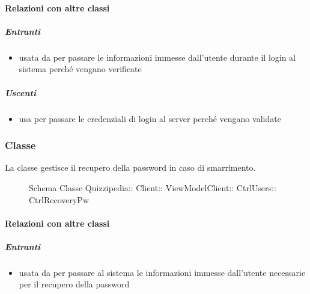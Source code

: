 \paragraph{Relazioni con altre classi}
\subparagraph{Entranti}
\begin{itemize}
\item usata da  per passare le informazioni immesse dall'utente durante il login al sistema perché vengano verificate
\end{itemize}
\subparagraph{Uscenti}
\begin{itemize}
\item usa  per passare le credenziali di login al server perché vengano validate
\end{itemize}
\subsubsection{Classe }
La classe gestisce il recupero della password in caso di smarrimento.
\begin{figure}[H]
\centering
\noindent{}
\caption[Schema Classe CtrlRecoveryPw]{Schema Classe Quizzipedia:: Client:: ViewModelClient:: CtrlUsers:: CtrlRecoveryPw}
\end{figure}
\paragraph{Relazioni con altre classi}
\subparagraph{Entranti}
\begin{itemize}
\item usata da  per passare al sistema le informazioni immesse dall'utente necessarie per il recupero della password
\end{itemize}
